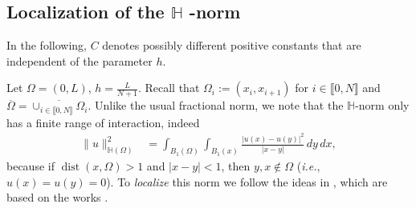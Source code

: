 \documentclass[11 pt]{article}
\newcommand\inter[1]{\llbracket #1\rrbracket}
\numberwithin{equation}{section}
\def\dist{\operatorname{dist}}
\begin{document}
\subsection{Localization of the
\texorpdfstring{$\mathbb{H}$}{H}
-norm}\label{sec:localization-norm}

In the following, $C$ denotes possibly different positive constants that are independent of the parameter $h$. 

Let $\Omega=(0,L)$, $h=\frac{L}{N+1}$. Recall that $\Omega_i:=(x_{i},x_{i+1})$ for $i\in\inter{0,N}$ and $\overline{\Omega}=\overline{\cup_{i\in\inter{0,N}}\Omega_i}$. Unlike the usual fractional norm, we note that the $\mathbb H$-norm only has a finite range of interaction, indeed
%
\begin{align}\label{eq:norm_R_bound}
    \|u\|^2_{\mathbb H(\Omega)} &=\int_{B_1(\Omega)}\int_{B_1(x)}\frac{|u(x)-u(y)|^2}{|x-y|}\, dy\, dx,
\end{align}
%
because if $\dist(x,\Omega)>1$ and $|x-y|<1$, then $y,x\not\in \Omega$ (\emph{i.e.}, $u(x)=u(y)=0$).  To \emph{localize} this norm we follow the ideas in \cite{Bor17}, which are based on the works \cite{Fae00,Fae02}.
\end{document}
